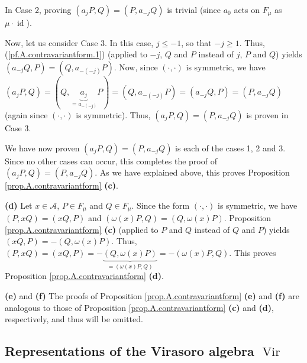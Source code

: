 \documentclass[etingof-lie.tex]{subfiles}
\begin{document}
In Case 2, proving $\left(  a_{j}P,Q\right)  =\left(  P,a_{-j}Q\right)  $ is
trivial (since $a_{0}$ acts on $F_{\mu}$ as $\mu\cdot\operatorname*{id}$).

Now, let us consider Case 3. In this case, $j\leq-1$, so that $-j\geq1$. Thus,
(\ref{pf.A.contravariantform.1}) (applied to $-j$, $Q$ and $P$ instead of $j$,
$P$ and $Q$) yields $\left(  a_{-j}Q,P\right)  =\left(  Q,a_{-\left(
-j\right)  }P\right)  $. Now, since $\left(  \cdot,\cdot\right)  $ is
symmetric, we have $\left(  a_{j}P,Q\right)  =\left(  Q,\underbrace{a_{j}%
}_{=a_{-\left(  -j\right)  }}P\right)  =\left(  Q,a_{-\left(  -j\right)
}P\right)  =\left(  a_{-j}Q,P\right)  =\left(  P,a_{-j}Q\right)  $ (again
since $\left(  \cdot,\cdot\right)  $ is symmetric). Thus, $\left(
a_{j}P,Q\right)  =\left(  P,a_{-j}Q\right)  $ is proven in Case 3.

We have now proven $\left(  a_{j}P,Q\right)  =\left(  P,a_{-j}Q\right)  $ is
each of the cases 1, 2 and 3. Since no other cases can occur, this completes
the proof of $\left(  a_{j}P,Q\right)  =\left(  P,a_{-j}Q\right)  $. As we
have explained above, this proves Proposition \ref{prop.A.contravariantform}
\textbf{(c)}.

\textbf{(d)} Let $x\in\mathcal{A}$, $P\in F_{\mu}$ and $Q\in F_{\mu}$. Since
the form $\left(  \cdot,\cdot\right)  $ is symmetric, we have $\left(
P,xQ\right)  =\left(  xQ,P\right)  $ and $\left(  \omega\left(  x\right)
P,Q\right)  =\left(  Q,\omega\left(  x\right)  P\right)  $. Proposition
\ref{prop.A.contravariantform} \textbf{(c)} (applied to $P$ and $Q$ instead of
$Q$ and $P$) yields $\left(  xQ,P\right)  =-\left(  Q,\omega\left(  x\right)
P\right)  $. Thus, $\left(  P,xQ\right)  =\left(  xQ,P\right)
=-\underbrace{\left(  Q,\omega\left(  x\right)  P\right)  }_{=\left(
\omega\left(  x\right)  P,Q\right)  }=-\left(  \omega\left(  x\right)
P,Q\right)  $. This proves Proposition \ref{prop.A.contravariantform}
\textbf{(d)}.

\textbf{(e)} and \textbf{(f)} The proofs of Proposition
\ref{prop.A.contravariantform} \textbf{(e)} and \textbf{(f)} are analogous to
those of Proposition \ref{prop.A.contravariantform} \textbf{(c)} and
\textbf{(d)}, respectively, and thus will be omitted.

\subsection{Representations of the Virasoro algebra
\texorpdfstring{$\operatorname*{Vir}$}{Vir}}
\end{document}
